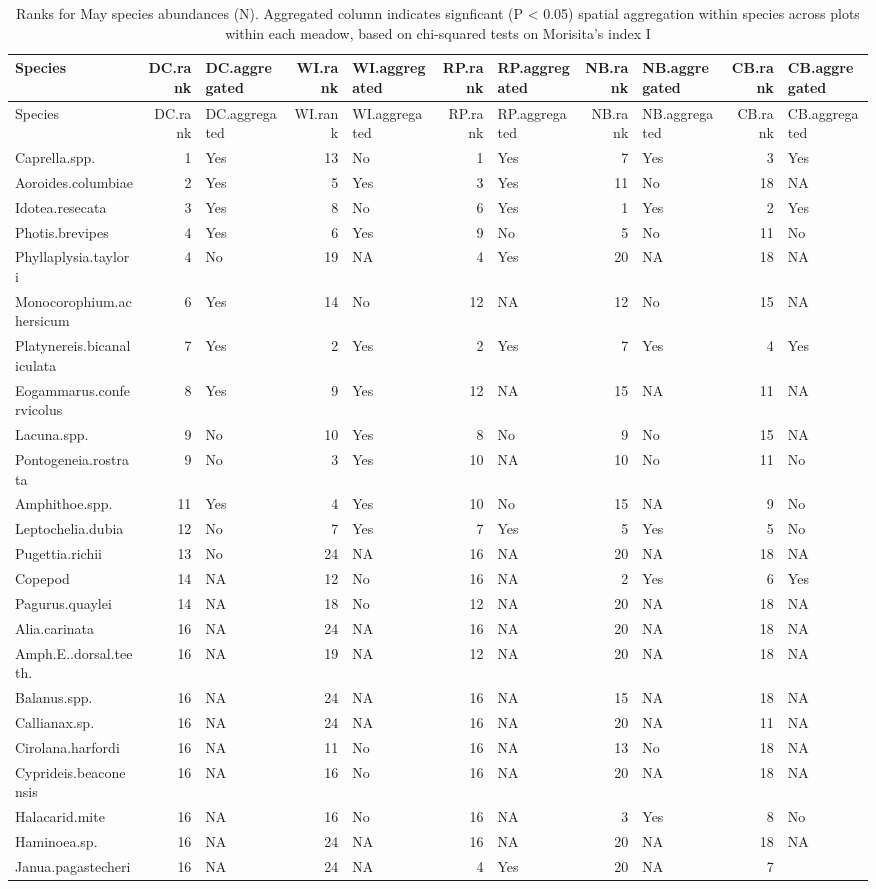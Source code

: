 \documentclass[]{article}
\begin{document}
\begin{longtable}[]{@{}lrlrlrlrlrl@{}}
\caption{Ranks for May species abundances (N). Aggregated column
indicates signficant (P \textless{} 0.05) spatial aggregation within
species across plots within each meadow, based on chi-squared tests on
Morisita's index I}\tabularnewline
\toprule
Species & DC.rank & DC.aggregated & WI.rank & WI.aggregated & RP.rank &
RP.aggregated & NB.rank & NB.aggregated & CB.rank &
CB.aggregated\tabularnewline
\midrule
\endfirsthead
\toprule
Species & DC.rank & DC.aggregated & WI.rank & WI.aggregated & RP.rank &
RP.aggregated & NB.rank & NB.aggregated & CB.rank &
CB.aggregated\tabularnewline
\midrule
\endhead
Caprella.spp. & 1 & Yes & 13 & No & 1 & Yes & 7 & Yes & 3 &
Yes\tabularnewline
Aoroides.columbiae & 2 & Yes & 5 & Yes & 3 & Yes & 11 & No & 18 &
NA\tabularnewline
Idotea.resecata & 3 & Yes & 8 & No & 6 & Yes & 1 & Yes & 2 &
Yes\tabularnewline
Photis.brevipes & 4 & Yes & 6 & Yes & 9 & No & 5 & No & 11 &
No\tabularnewline
Phyllaplysia.taylori & 4 & No & 19 & NA & 4 & Yes & 20 & NA & 18 &
NA\tabularnewline
Monocorophium.achersicum & 6 & Yes & 14 & No & 12 & NA & 12 & No & 15 &
NA\tabularnewline
Platynereis.bicanaliculata & 7 & Yes & 2 & Yes & 2 & Yes & 7 & Yes & 4 &
Yes\tabularnewline
Eogammarus.confervicolus & 8 & Yes & 9 & Yes & 12 & NA & 15 & NA & 11 &
NA\tabularnewline
Lacuna.spp. & 9 & No & 10 & Yes & 8 & No & 9 & No & 15 &
NA\tabularnewline
Pontogeneia.rostrata & 9 & No & 3 & Yes & 10 & NA & 10 & No & 11 &
No\tabularnewline
Amphithoe.spp. & 11 & Yes & 4 & Yes & 10 & No & 15 & NA & 9 &
No\tabularnewline
Leptochelia.dubia & 12 & No & 7 & Yes & 7 & Yes & 5 & Yes & 5 &
No\tabularnewline
Pugettia.richii & 13 & No & 24 & NA & 16 & NA & 20 & NA & 18 &
NA\tabularnewline
Copepod & 14 & NA & 12 & No & 16 & NA & 2 & Yes & 6 & Yes\tabularnewline
Pagurus.quaylei & 14 & NA & 18 & No & 12 & NA & 20 & NA & 18 &
NA\tabularnewline
Alia.carinata & 16 & NA & 24 & NA & 16 & NA & 20 & NA & 18 &
NA\tabularnewline
Amph.E..dorsal.teeth. & 16 & NA & 19 & NA & 12 & NA & 20 & NA & 18 &
NA\tabularnewline
Balanus.spp. & 16 & NA & 24 & NA & 16 & NA & 15 & NA & 18 &
NA\tabularnewline
Callianax.sp. & 16 & NA & 24 & NA & 16 & NA & 20 & NA & 11 &
NA\tabularnewline
Cirolana.harfordi & 16 & NA & 11 & No & 16 & NA & 13 & No & 18 &
NA\tabularnewline
Cyprideis.beaconensis & 16 & NA & 16 & No & 16 & NA & 20 & NA & 18 &
NA\tabularnewline
Halacarid.mite & 16 & NA & 16 & No & 16 & NA & 3 & Yes & 8 &
No\tabularnewline
Haminoea.sp. & 16 & NA & 24 & NA & 16 & NA & 20 & NA & 18 &
NA\tabularnewline
Janua.pagastecheri & 16 & NA & 24 & NA & 4 & Yes & 20 & NA & 7 &

\end{longtable}
\end{document}
